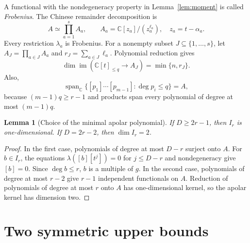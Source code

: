 \documentclass[11pt]{article}
\newtheorem{lemma}[theorem]{Lemma}
\theoremstyle{definition}
\theoremstyle{remark}
\newcommand{\C}{\mathbb C}
\newcommand{\spanC}{\operatorname{span}_{\C}}
\newcommand{\im}{\operatorname{im}}
\begin{document}
A functional with the nondegeneracy property in Lemma~\ref{lem:moment} is called
\emph{Frobenius}. The Chinese remainder decomposition is
\begin{equation}\label{eq:crt}
 A\simeq\prod_{a=1}^s A_a,
 \qquad A_a=\C[z_a]/(z_a^{\ell_a}),\quad z_a=t-\alpha_a.
\end{equation}
Every restriction $\lambda_a$ is Frobenius.
For a nonempty subset $J\subseteq\{1,\ldots,s\}$, let
$A_J=\prod_{a\in J}A_a$ and $r_J=\sum_{a\in J}\ell_a$.
Polynomial reduction gives
\begin{equation}\label{eq:restrictiondimensions}
 \dim \im(\C[t]_{\le q}\longrightarrow A_J)=\min\{n,r_J\}.
\end{equation}
Also,
\begin{equation}\label{eq:allbutone}
 \spanC\{[p_1]\cdots[p_{m-1}]:\deg p_i\le q\}=A,
\end{equation}
because $(m-1)q\ge r-1$ and products span every polynomial of degree at most
$(m-1)q$.

\begin{lemma}[Choice of the minimal apolar polynomial]\label{lem:unique}
If $D\ge2r-1$, then $I_r$ is one-dimensional. If $D=2r-2$, then
$\dim I_r=2$.
\end{lemma}
\begin{proof}
In the first case, polynomials of degree at most $D-r$ surject onto $A$.
For $b\in I_r$, the equations $\lambda([b][t^j])=0$ for $j\le D-r$ and
nondegeneracy give $[b]=0$. Since $\deg b\le r$, $b$ is a multiple of $g$.
In the second case, polynomials of degree at most $r-2$ give $r-1$ independent
functionals on $A$. Reduction of polynomials of degree at most $r$ onto $A$
has one-dimensional kernel, so the apolar kernel has dimension two.
\end{proof}

\section{Two symmetric upper bounds}\label{sec:upper}
\end{document}
